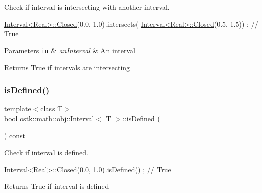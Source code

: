 Check if interval is intersecting with another interval. 


\begin{DoxyCode}
\hyperlink{classostk_1_1math_1_1obj_1_1_interval_a48e9f436e8994c49026a1ecd503bc190}{Interval<Real>::Closed}(0.0, 1.0).intersects(
      \hyperlink{classostk_1_1math_1_1obj_1_1_interval_a48e9f436e8994c49026a1ecd503bc190}{Interval<Real>::Closed}(0.5, 1.5)) ; \textcolor{comment}{// True}
\end{DoxyCode}



\begin{DoxyParams}[1]{Parameters}
\mbox{\tt in}  & {\em an\+Interval} & An interval \\
\hline
\end{DoxyParams}
\begin{DoxyReturn}{Returns}
True if intervals are intersecting 
\end{DoxyReturn}
\mbox{\label{classostk_1_1math_1_1obj_1_1_interval_a28ed286e10ecfd77bb9145c28c9c7dff}} 
\subsubsection{\texorpdfstring{is\+Defined()}{isDefined()}}
{\footnotesize\ttfamily template$<$class T$>$ \\
bool \hyperlink{classostk_1_1math_1_1obj_1_1_interval}{ostk\+::math\+::obj\+::\+Interval}$<$ T $>$\+::is\+Defined (\begin{DoxyParamCaption}{ }\end{DoxyParamCaption}) const}



Check if interval is defined. 


\begin{DoxyCode}
\hyperlink{classostk_1_1math_1_1obj_1_1_interval_a48e9f436e8994c49026a1ecd503bc190}{Interval<Real>::Closed}(0.0, 1.0).isDefined() ; \textcolor{comment}{// True}
\end{DoxyCode}


\begin{DoxyReturn}{Returns}
True if interval is defined 
\end{DoxyReturn}
\mbox{\label{classostk_1_1math_1_1obj_1_1_interval_a55edb92a6b3bfed37e60b016bd3a3e60}} 
